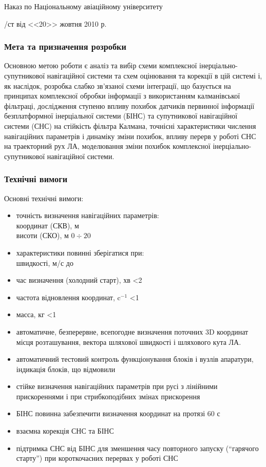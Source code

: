 \documentclass[ukrainian,utf8,simple,floatsingle,hpadding=5mm]{eskdtext}
\begin{document}
Наказ по Національному авіаційному університету

/ст від <<20>> жовтня 2010 р.

\subsubsection*{Мета та призначення розробки}

Основною метою роботи є аналіз та вибір схеми комплексної інерціально-супутникової 
навігаційної системи та схем оцінювання та корекції в цій системі і, як наслідок, 
розробка слабко зв’язаної схеми інтеграції, що базується на принципах комплексної 
обробки інформації з використанням калманівської фільтраці, дослідження ступеню 
впливу похибок датчиків первинної інформації  безплатформної інерціальної системи 
(БІНС) та супутникової навігаційної системи (СНС) на стійкість фільтра Калмана, 
точнісні характеристики числення навігаційних параметрів і динаміку зміни похибок, 
впливу перерв у роботі СНС на траекторний рух ЛА, моделювання зміни похибок 
комплексної інерціально-супутникової навігаційної системи.

\subsubsection*{Технічні вимоги}

Основні технічні вимоги:
\begin{itemize}
      \item точність визначення навігаційних параметрів:\\
  координат (СКВ), м \\
  висоти (СКО), м \dotfill $0\div20$
     \item характеристики повинні зберігатися при:\\
швидкості, м/с до 
     \item час визначення (холодний старт), хв \dotfill <2
     \item частота відновлення координат, c$^{-1}$ \dotfill <1
     \item масса, кг \dotfill <1
     \item автоматичне, безперервне, всепогодне визначення 
поточних 3D координат місця розташування, вектора шляхової 
швидкості і шляхового кута ЛА.
    \item автоматичний тестовий контроль функціонування блоків і 
вузлів апаратури, індикація блоків, що відмовили
    \item стійке визначення навігаційних параметрів при русі з 
лінійними прискореннями і при стрибкоподібних змінах прискорення
    \item БІНС повинна забезпечити визначення координат на протязі 60 с
    \item взаємна корекція СНС та БІНС
    \item підтримка СНС від БІНС для зменшення часу повторного 
запуску (“гарячого старту”) при короткочасних перервах у роботі СНС
\end{itemize}
\end{document}
